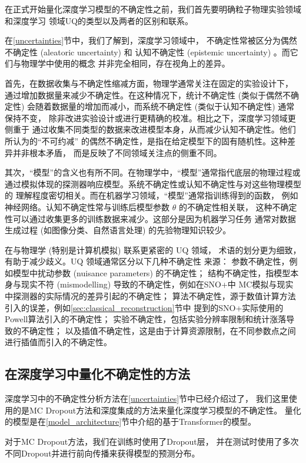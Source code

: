 在正式开始量化深度学习模型的不确定性之前，我们首先要明确粒子物理实验领域和深度学习
领域UQ的类型以及两者的区别和联系。\cite{ParticleDataGroup:2024cfk}


在\ref{uncertainties}节中，我们了解到，深度学习领域中，
不确定性常被区分为偶然不确定性 (aleatoric uncertainty) 和
认知不确定性 (epistemic uncertainty) 。而它们与物理学中使用的概念
并非完全相同，存在视角上的差异。

首先，在数据收集与不确定性缩减方面，物理学通常关注在固定的实验设计下，
通过增加数据量来减少不确定性。在这种情况下，统计不确定性 (类似于偶然不确定性) 
会随着数据量的增加而减小，而系统不确定性 (类似于认知不确定性) 通常保持不变，
除非改进实验设计或进行更精确的校准。相比之下，深度学习领域更侧重于
通过收集不同类型的数据来改进模型本身，从而减少认知不确定性。他们所认为的“不可约减”
的偶然不确定性，是指在给定模型下的固有随机性。这种差异并非根本矛盾，
而是反映了不同领域关注点的侧重不同。

其次，“模型”的含义也有所不同。在物理学中，“模型”通常指代底层的物理过程或
通过模拟体现的探测器响应模型。系统不确定性或认知不确定性与对这些物理模型的
理解程度密切相关。而在机器学习领域，“模型”通常指训练得到的函数，
例如神经网络。认知不确定性常与训练后模型参数 $\theta$ 的不确定性相关联，
这种不确定性可以通过收集更多的训练数据来减少。这部分是因为机器学习任务
通常对数据生成过程 (如图像分类、自然语言处理) 的先验物理知识较少。

在与物理学 (特别是计算机模拟) 联系更紧密的 UQ 领域，
术语的划分更为细致，有助于减少歧义。UQ 领域通常区分以下几种不确定性
来源：
参数不确定性，例如模型中扰动参数 (nuisance parameters) 的不确定性；
结构不确定性，指模型本身与现实不符 (mismodelling) 导致的不确定性，例如在SNO+中
MC模拟与现实中探测器的实际情况的差异引起的不确定性；
算法不确定性，源于数值计算方法引入的误差，例如\ref{sec:classical_reconstruction}节中
提到的SNO+实际使用的Powell算法引入的不确定性；
实验不确定性，包括实验分辨率限制和统计涨落导致的不确定性；
以及插值不确定性，这是由于计算资源限制，在不同参数点之间进行插值而引入的不确定性。

\subsection{在深度学习中量化不确定性的方法}

深度学习中的不确定性分析方法在\ref{uncertainties}节中已经介绍过了，
我们这里使用的是MC Dropout方法和深度集成的方法来量化深度学习模型的不确定性。
量化的模型是在\ref{model_architecture}节中介绍的基于Transformer的模型。

对于MC Dropout方法，我们在训练时使用了Dropout层，
并在测试时使用了多次不同Dropout并进行前向传播来获得模型的预测分布。

